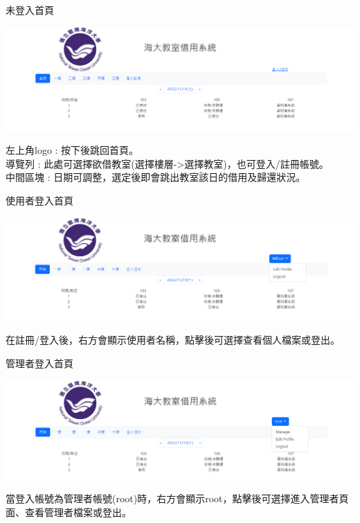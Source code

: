 \documentclass{article}
\begin{document}
\begin{Large}
	未登入首頁
\end{Large}
\bigskip
\begin{center}
	\includegraphics[scale=0.35]{SDDFirstpage.png}
\end{center}
	左上角logo : 按下後跳回首頁。
	\bigskip
 \\ 導覽列     : 此處可選擇欲借教室(選擇樓層->選擇教室)，也可登入/註冊帳號。
 	\bigskip
 \\ 中間區塊   : 日期可調整，選定後即會跳出教室該日的借用及歸還狀況。
 
\bigskip
\bigskip
\bigskip
\bigskip
\bigskip
\hspace*{\fill} 

\begin{Large}
	使用者登入首頁
\end{Large}
\bigskip
\begin{center}
	\includegraphics[scale=0.35]{SDDUserLoginnedFirstpage.png}
\end{center}
在註冊/登入後，右方會顯示使用者名稱，點擊後可選擇查看個人檔案或登出。
\bigskip
\newpage

\begin{Large}
	管理者登入首頁
\end{Large}
\bigskip
\begin{center}
	\includegraphics[scale=0.35]{SDDAdminLoginnedFirstpage.png}
\end{center}
\bigskip
\bigskip
當登入帳號為管理者帳號(root)時，右方會顯示root，點擊後可選擇進入管理者頁面、查看管理者檔案或登出。
\bigskip
\bigskip
\bigskip
\bigskip
\bigskip
\bigskip
\end{document}

